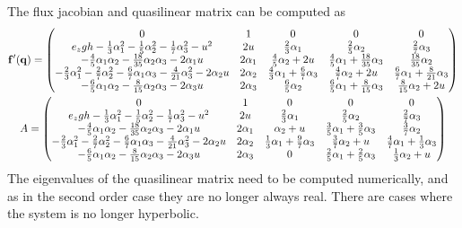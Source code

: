   The flux jacobian and quasilinear matrix can be computed as
  \begin{gather}
    \mathbf{f}'(\mathbf{q}) =
    \begin{pmatrix}
      0 & 1 & 0 & 0 & 0 \\
      e_{z} g h - \frac{1}{3} \alpha_{1}^{2} - \frac{1}{5} \alpha_{2}^{2} - \frac{1}{7} \alpha_{3}^{2} - u^{2} & 2 u & \frac{2}{3} \alpha_{1} & \frac{2}{5} \alpha_{2} & \frac{2}{7} \alpha_{3} \\
      -\frac{4}{5} \alpha_{1} \alpha_{2} - \frac{18}{35} \alpha_{2} \alpha_{3} - 2 \alpha_{1} u & 2 \alpha_{1} & \frac{4}{5} \alpha_{2} + 2 u & \frac{4}{5} \alpha_{1} + \frac{18}{35} \alpha_{3} & \frac{18}{35} \alpha_{2} \\
      -\frac{2}{3} \alpha_{1}^{2} - \frac{2}{7} \alpha_{2}^{2} - \frac{6}{7} \alpha_{1} \alpha_{3} - \frac{4}{21} \alpha_{3}^{2} - 2 \alpha_{2} u & 2 \alpha_{2} & \frac{4}{3} \alpha_{1} + \frac{6}{7} \alpha_{3} & \frac{4}{7} \alpha_{2} + 2 u & \frac{6}{7} \alpha_{1} + \frac{8}{21} \alpha_{3} \\
      -\frac{6}{5} \alpha_{1} \alpha_{2} - \frac{8}{15} \alpha_{2} \alpha_{3} - 2 \alpha_{3} u & 2 \alpha_{3} & \frac{6}{5} \alpha_{2} & \frac{6}{5} \alpha_{1} + \frac{8}{15} \alpha_{3} & \frac{8}{15} \alpha_{2} + 2 u
    \end{pmatrix} \\
    A =
    \begin{pmatrix}
      0 & 1 & 0 & 0 & 0 \\
      e_{z} g h - \frac{1}{3} \alpha_{1}^{2} - \frac{1}{5} \alpha_{2}^{2} - \frac{1}{7} \alpha_{3}^{2} - u^{2} & 2 u & \frac{2}{3} \alpha_{1} & \frac{2}{5} \alpha_{2} & \frac{2}{7} \alpha_{3} \\
      -\frac{4}{5} \alpha_{1} \alpha_{2} - \frac{18}{35} \alpha_{2} \alpha_{3} - 2 \alpha_{1} u & 2 \alpha_{1} & \alpha_{2} + u & \frac{3}{5} \alpha_{1} + \frac{3}{5} \alpha_{3} & \frac{3}{7} \alpha_{2} \\
      -\frac{2}{3} \alpha_{1}^{2} - \frac{2}{7} \alpha_{2}^{2} - \frac{6}{7} \alpha_{1} \alpha_{3} - \frac{4}{21} \alpha_{3}^{2} - 2 \alpha_{2} u & 2 \alpha_{2} & \frac{1}{3} \alpha_{1} + \frac{9}{7} \alpha_{3} & \frac{3}{7} \alpha_{2} + u & \frac{4}{7} \alpha_{1} + \frac{1}{3} \alpha_{3} \\
      -\frac{6}{5} \alpha_{1} \alpha_{2} - \frac{8}{15} \alpha_{2} \alpha_{3} - 2 \alpha_{3} u & 2 \alpha_{3} & 0 & \frac{2}{5} \alpha_{1} + \frac{2}{5} \alpha_{3} & \frac{1}{3} \alpha_{2} + u
    \end{pmatrix}
  \end{gather}
  The eigenvalues of the quasilinear matrix need to be computed numerically, and
  as in the second order case they are no longer always real.
  There are cases where the system is no longer hyperbolic.

